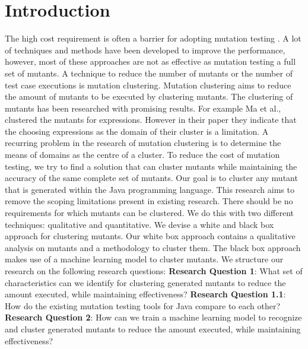 \documentclass[conference,draftclsnofoot,onecolumn]{IEEEtran}
\begin{document}
\begin{IEEEkeywords}

\end{IEEEkeywords}

\section{Introduction}
The high cost requirement is often a barrier for adopting mutation testing \cite{Pizzoleto2019}.
A lot of techniques and methods have been developed to improve the performance, however, most of these approaches are not as effective as mutation testing a full set of mutants\cite{Pizzoleto2019,Yao2014}. 
\newline
A technique to reduce the number of mutants or the number of test case executions is mutation clustering.
Mutation clustering aims to reduce the amount of mutants to be executed by clustering mutants\cite{Ma2016,Yu2019PossibilityScope}.
The clustering of mutants has been researched with promising results\cite{Ji2009,Wilinski2015,Ma2016}. For example Ma et al., \cite{Ma2016} clustered the mutants for expressions. 
However in their paper they indicate that the choosing expressions as the domain of their cluster is a limitation.
A recurring problem in the research of mutation clustering is to determine the means of domains as the centre of a cluster\cite{Ji2009,Wilinski2015,Ma2016,Wei2021SpectralTesting}.
\newline
To reduce the cost of mutation testing, we try to find a solution that can cluster mutants while maintaining the accuracy of the same complete set of mutants. 
Our goal is to cluster any mutant that is generated within the Java programming language.
This research aims to remove the scoping limitations present in existing research.
There should be no requirements for which mutants can be clustered.
We do this with two different techniques: qualitative and quantitative.
We devise a white and black box approach for clustering mutants.
Our white box approach contains a qualitative analysis on mutants and a methodology to cluster them.
The black box approach makes use of a machine learning model to cluster mutants.
We structure our research on the following research questions:
\newline
\textbf{Research Question 1}: What set of characteristics can we identify for clustering generated mutants to reduce the amount executed, while maintaining effectiveness?
\newline
\textbf{Research Question 1.1}: How do the existing mutation testing tools for Java compare to each other?
\newline
\textbf{Research Question 2}: How can we train a machine learning model to recognize and cluster generated mutants to reduce the amount executed, while maintaining effectiveness?
\end{document}
